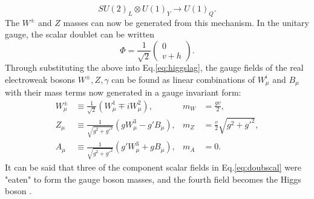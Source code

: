 \documentclass[a4paper,12pt]{article}
\begin{document}
\begin{equation}
    \label{eq:symbreak}
    SU(2)_L\otimes U(1)_Y \to U(1)_Q.
\end{equation}
The $W^\pm$ and $Z$ masses can now be generated from this mechanism. 
In the unitary gauge, the scalar doublet can be written
\begin{equation}
    \label{eq:unig}
    \Phi = \frac{1}{\sqrt{2}}\begin{pmatrix}0\\v+h\end{pmatrix}.
\end{equation}
Through substituting the above into Eq.\eqref{eq:higgslag}, the gauge fields of the real electroweak bosons $W^{\pm},Z,\gamma$ can be found as linear combinations of $W^i_\mu$ and $B_\mu$ with their mass terms now generated in a gauge invariant form:
\begin{align}
    \label{eq:gagmix}
    W^\pm_\mu &\equiv \frac{1}{\sqrt{2}}(W_\mu^1 \mp iW_\mu^2), & m_W &= \frac{gv}{2}, \\
    Z_\mu &\equiv \frac{1}{\sqrt{g^2+g'^2}}(gW^3_\mu-g'B_\mu), & m_Z &= \frac{v}{2}\sqrt{g^2+g'^2},\\
    A_\mu &\equiv \frac{1}{\sqrt{g^2+g'^2}}(g'W_\mu^3+gB_\mu), & m_A &= 0.
\end{align}
It can be said that three of the component scalar fields in Eq.\eqref{eq:doubscal} were "eaten" to form the gauge boson masses, and the fourth field becomes the Higgs boson \cite{schwartz}.
\end{document}
